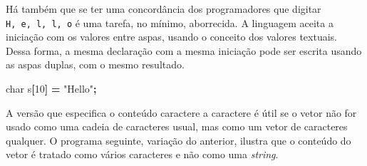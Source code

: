 \documentclass[
  11pt,
  a4paper,
]{scrbook}
\newenvironment{Shaded}{\begin{snugshade}}{\end{snugshade}}
\newcommand{\DataTypeTok}[1]{\textcolor[rgb]{0.13,0.29,0.53}{#1}}
\newcommand{\DecValTok}[1]{\textcolor[rgb]{0.00,0.00,0.81}{#1}}
\newcommand{\NormalTok}[1]{#1}
\newcommand{\OperatorTok}[1]{\textcolor[rgb]{0.81,0.36,0.00}{\textbf{#1}}}
\newcommand{\StringTok}[1]{\textcolor[rgb]{0.31,0.60,0.02}{#1}}
\begin{document}
Há também que se ter uma concordância dos programadores que digitar
\texttt{\textquotesingle{}H\textquotesingle{},\ \textquotesingle{}e\textquotesingle{},\ \textquotesingle{}l\textquotesingle{},\ \textquotesingle{}l\textquotesingle{},\ \textquotesingle{}o\textquotesingle{}}
é uma tarefa, no mínimo, aborrecida. A linguagem aceita a iniciação com
os valores entre aspas, usando o conceito dos valores textuais. Dessa
forma, a mesma declaração com a mesma iniciação pode ser escrita usando
as aspas duplas, com o mesmo resultado.

\begin{Shaded}
\begin{Highlighting}[]
\DataTypeTok{char}\NormalTok{ s}\OperatorTok{[}\DecValTok{10}\OperatorTok{]} \OperatorTok{=} \StringTok{"Hello"}\OperatorTok{;}
\end{Highlighting}
\end{Shaded}

A versão que especifica o conteúdo caractere a caractere é útil se o
vetor não for usado como uma cadeia de caracteres usual, mas como um
vetor de caracteres qualquer. O programa seguinte, variação do anterior,
ilustra que o conteúdo do vetor é tratado como vários caracteres e não
como uma \emph{string}.
\end{document}
